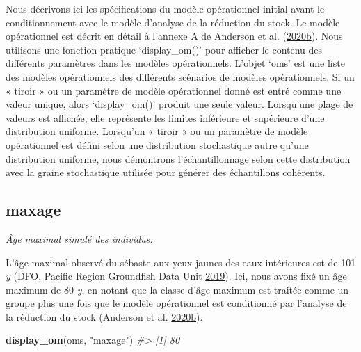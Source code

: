 \documentclass[11pt]{book}
\newenvironment{Shaded}{\begin{snugshade}}{\end{snugshade}}
\newcommand{\CommentTok}[1]{\textcolor[rgb]{0.56,0.35,0.01}{\textit{#1}}}
\newcommand{\KeywordTok}[1]{\textcolor[rgb]{0.13,0.29,0.53}{\textbf{#1}}}
\newcommand{\NormalTok}[1]{#1}
\newcommand{\StringTok}[1]{\textcolor[rgb]{0.31,0.60,0.02}{#1}}
\begin{document}
\clearpage

\label{app:desc-om-yelloweye}

Nous décrivons ici les spécifications du modèle opérationnel initial avant le conditionnement avec le modèle d'analyse de la réduction du stock. Le modèle opérationnel est décrit en détail à l'annexe A de Anderson et al. (\protect\hyperlink{ref-anderson2020gfmp}{2020}\protect\hyperlink{ref-anderson2020gfmp}{b}). Nous utilisons une fonction pratique `display\_om()' pour afficher le contenu des différents paramètres dans les modèles opérationnels. L'objet `oms' est une liste des modèles opérationnels des différents scénarios de modèles opérationnels. Si un « tiroir » ou un paramètre de modèle opérationnel donné est entré comme une valeur unique, alors `display\_om()' produit une seule valeur. Lorsqu'une plage de valeurs est affichée, elle représente les limites inférieure et supérieure d'une distribution uniforme. Lorsqu'un « tiroir » ou un paramètre de modèle opérationnel est défini selon une distribution stochastique autre qu'une distribution uniforme, nous démontrons l'échantillonnage selon cette distribution avec la graine stochastique utilisée pour générer des échantillons cohérents.

\label{app:desc-stock-yelloweye}

\label{app:desc-stock-maxage-yelloweye}
\subsection{maxage}

\emph{Âge maximal simulé des individus. }

L'âge maximal observé du sébaste aux yeux jaunes des eaux intérieures est de 101 \emph{y} (DFO, Pacific Region Groundfish Data Unit \protect\hyperlink{ref-databases2019}{2019}). Ici, nous avons fixé un âge maximum de 80 \emph{y}, en notant que la classe d'âge maximum est traitée comme un groupe plus une fois que le modèle opérationnel est conditionné par l'analyse de la réduction du stock (Anderson et al. \protect\hyperlink{ref-anderson2020gfmp}{2020}\protect\hyperlink{ref-anderson2020gfmp}{b}).
\begin{Shaded}
\begin{Highlighting}[]
\KeywordTok{display_om}\NormalTok{(oms, }\StringTok{"maxage"}\NormalTok{)}
\CommentTok{#> [1] 80}
\end{Highlighting}
\end{Shaded}
\label{app:desc-stock-m-yelloweye}
\end{document}
